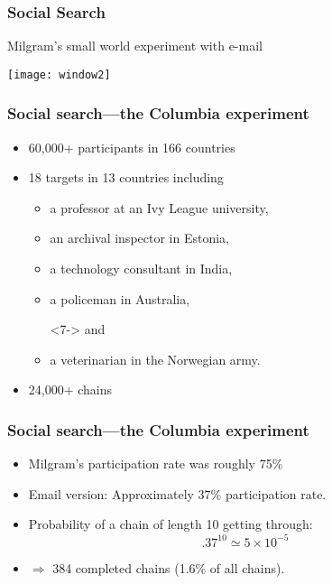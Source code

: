 \begin{frame}
  \frametitle{Social Search}


  \begin{block}{Milgram's small world experiment with e-mail\cite{dodds2003b}}
    \begin{center}
      \texttt{[image: window2]}
    \end{center}
  \end{block}

\end{frame}

\begin{frame}
  \frametitle{Social search---the Columbia experiment}

  \begin{itemize}
  \item<1-> 
    60,000+ participants in 166 countries
  \item<2-> 
    18 targets in 13 countries including
    \begin{itemize}
    \item<3-> 
      a professor at an Ivy League university,\\
    \item<4-> 
      an archival inspector in Estonia,\\
    \item<5-> 
      a technology consultant in India,\\
    \item<6-> 
      a policeman in Australia,\\
    \item[]<7-> 
      and 
    \item<7-> 
      a veterinarian in the Norwegian army.
    \end{itemize}
  \item<8->
    24,000+ chains
  \end{itemize}

\end{frame}

\begin{frame}
  \frametitle{Social search---the Columbia experiment}

  \begin{itemize}
  \item<1->
    Milgram's participation rate was roughly 75\%
  \item<2->
    Email version: Approximately 37\% participation rate.
  \item<3->
    Probability of a chain of length 10 getting through:
    $$.37^{10} \simeq 5 \times 10^{-5}$$
  \item<4->
  $\Rightarrow$ 384 completed chains (1.6\% of all chains).
  \end{itemize}
  
\end{frame}

